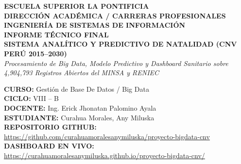 \documentclass[12pt,a4paper]{article}
\begin{document}
\begin{titlepage}
    
    \vspace*{-0.5cm} 
    \begin{center}
        {\Large \textbf{ESCUELA SUPERIOR LA PONTIFICIA}}\\[0.2cm]
        {\large \textbf{DIRECCIÓN ACADÉMICA / CARRERAS PROFESIONALES}}\\[0.2cm]
        {\large \textbf{INGENIERÍA DE SISTEMAS DE INFORMACIÓN}}\\[0.4cm]
        
        \vspace{0.6cm}
        \textbf{\Huge INFORME TÉCNICO FINAL}\\[0.3cm]
        \textbf{\LARGE SISTEMA ANALÍTICO Y PREDICTIVO DE NATALIDAD (CNV PERÚ 2015--2030)}\\[0.3cm]
        {\large \textit{Procesamiento de Big Data, Modelo Predictivo y Dashboard Sanitario sobre 4,904,793 Registros Abiertos del MINSA y RENIEC}}
        \vspace{0.8cm}
    \end{center}

    \vfill

    \begin{flushleft}
        \large
        \textbf{CURSO:} Gestión de Base De Datos / Big Data\\[0.15cm]
        \textbf{CICLO:} VIII – B\\[0.15cm]
        \textbf{DOCENTE:} Ing. Erick Jhonatan Palomino Ayala\\[0.15cm]
        \textbf{ESTUDIANTE:} Curahua Morales, Any Miluska\\[0.15cm]
        \textbf{REPOSITORIO GITHUB:} \url{https://github.com/curahuamoralesanymiluska/proyecto-bigdata-cnv}\\[0.15cm]
        \textbf{DASHBOARD EN VIVO:} \url{https://curahuamoralesanymiluska.github.io/proyecto-bigdata-cnv/}
    \end{flushleft}
    \vspace{1.5cm}
\end{titlepage}
\end{document}
